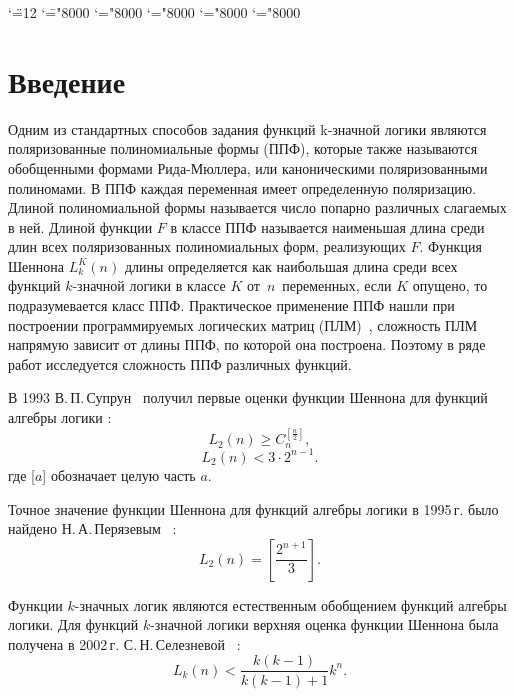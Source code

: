 \documentclass[a4paper, 14pt]{extarticle}
\begin{document}
\begingroup \catcode`\"=12
\gdef\newmcodes@{\mathcode`\'39\mathcode`\*42\mathcode`\."613A%
\mathcode`\-"8000\mathcode`\/47\mathcode`\:"603A\relax}%
\endgroup
\mathcode`\=="8000 \mathcode`\+="8000 \mathcode`\-="8000
\mathcode`\<="8000 \mathcode`\>="8000



\setcounter{secnumdepth}{-1}

\section{Введение}
Одним из стандартных способов задания функций k\nobreakdash-значной логики являются поляризованные полиномиальные формы (ППФ),
которые также называются обобщенными формами Рида-Мюллера, или каноническими поляризованными полиномами. В ППФ каждая переменная
имеет определенную поляризацию. Длиной полиномиальной формы называется число попарно различных слагаемых в ней. Длиной функции
$F$ в классе ППФ называется наименьшая длина среди длин всех поляризованных полиномиальных форм, реализующих $F$.
Функция Шеннона $L^K_k(n)$ длины определяется как наибольшая длина среди всех функций $k$\nobreakdash-значной логики в классе $K$
от~$n$~переменных, если $K$ опущено, то подразумевается класс ППФ.
Практическое применение ППФ нашли при построении программируемых логических матриц (ПЛМ)~\cite{ue04, sb90}, сложность ПЛМ
напрямую зависит от длины ППФ, по которой она построена. Поэтому в ряде работ исследуется сложность ППФ различных функций.

В 1993  В.\,П.\,Супрун~\cite{sv93} получил первые оценки функции Шеннона для функций алгебры логики :
$$
L_2(n) \geqslant C_n^{[\frac{n}{2}]},
$$
$$
L_2(n) < 3 \cdot 2^{n-1}.
$$
где [$a$] обозначает целую часть $a$.

Точное значение функции Шеннона для функций алгебры логики в 1995\,г. было
найдено Н.\,А.\,Перязевым~\cite{pn95} :
$$
L_2(n) = \left[\frac{2^{n+1}}{3}\right].
$$

Функции $k$\nobreakdash-значных логик являются естественным обобщением функций алгебры логики.
Для функций $k$\nobreakdash-значной логики верхняя оценка функции Шеннона была получена в 2002\,г. С.\,Н.\,Селезневой~\cite{ss02} :
$$
L_k(n) < \frac{k(k-1)}{k(k-1)+1}k^n.
$$
\end{document}
